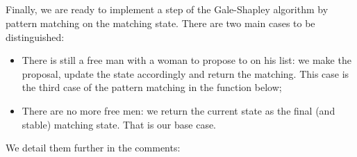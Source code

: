 {\begin{code}
\AgdaOperator{\AgdaInductiveConstructor{,}}\AgdaSpace{}%
\AgdaSymbol{))}\<%
\\
\>[0]\AgdaSpace{}%
\AgdaSymbol{|}\AgdaSpace{}%
\AgdaSymbol{\AgdaUnderscore{}}%
\>[14]\AgdaSymbol{=}%
\>[755I]\AgdaSymbol{(}\AgdaSpace{}%
\AgdaOperator{\AgdaInductiveConstructor{,}}\AgdaSpace{}%
\AgdaSymbol{)}\AgdaSpace{}%
\<%
\\
\>[.]\<[755I]%
\>[16]\AgdaSymbol{(}\AgdaSpace{}%
\AgdaSymbol{(}\AgdaSpace{}%
\AgdaSymbol{(}\AgdaSpace{}%
\AgdaOperator{\AgdaInductiveConstructor{,}}\AgdaSpace{}%
\AgdaSymbol{)}\AgdaSpace{}%
\AgdaSpace{}%
\AgdaSymbol{(}\AgdaSpace{}%
\AgdaSpace{}%
\AgdaSymbol{)))}\<%
\\
%
\>[16]\AgdaOperator{\AgdaInductiveConstructor{,}}\<%
\\
%
\>[16]\AgdaSpace{}%
\AgdaSymbol{(}\AgdaSpace{}%
\AgdaSymbol{(}\AgdaSpace{}%
\AgdaOperator{\AgdaInductiveConstructor{,}}\AgdaSpace{}%
\AgdaSymbol{)}\AgdaSpace{}%
\AgdaSpace{}%
\AgdaSymbol{(}\AgdaSpace{}%
\AgdaSpace{}%
\AgdaSymbol{))}\<%
\end{code}

Finally, we are ready to implement a step of the Gale-Shapley algorithm by pattern matching on the matching state. There are two main cases to be distinguished:

\begin{itemize}
    \item There is still a free man with a woman to propose to on his list: we make the proposal, update the state accordingly and return the matching. This case is the third case of the pattern matching in the function below;
    \item There are no more free men: we return the current state as the final (and stable) matching state. That is our base case.
\end{itemize}

We detail them further in the comments:

}
